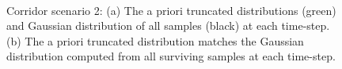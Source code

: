 \documentclass[letterpaper]{article}
\begin{document}
\begin{figure}[t]
\begin{center}
\\
\vspace{-20pt}
\end{center}
\caption{ Corridor scenario 2: (a) The a priori truncated distributions (green) and Gaussian distribution of all samples (black) at each time-step. (b) The a priori truncated distribution matches the Gaussian distribution computed from all surviving samples at each time-step.}
\label{fig:panel4}
\end{figure}
\end{document}
